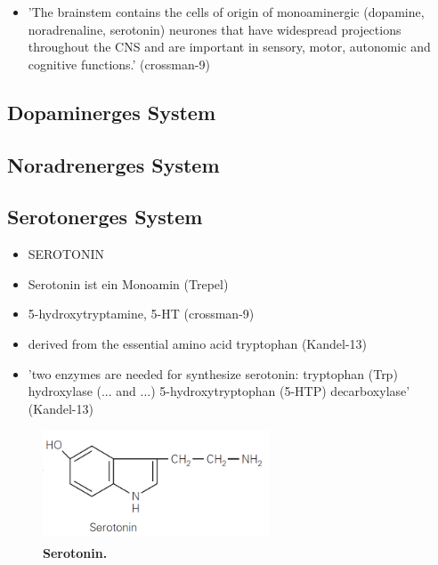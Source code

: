 \documentclass[12pt,a4paper,pdftex]{article}
\begin{document}
\begin{itemize}
    \item 'The brainstem contains the cells of origin of monoaminergic (dopamine, noradrenaline, serotonin) neurones that have widespread projections throughout the CNS and are important in sensory, motor, autonomic and cognitive functions.' (crossman-9)
\end{itemize}{}


\subsection{Dopaminerges System}
\label{dopaminerges_system}

\subsection{Noradrenerges System}
\label{noradrenerges_system}

\subsection{Serotonerges System}
\label{serotonerges_system}

\begin{itemize}
    \item SEROTONIN
    \item Serotonin ist ein Monoamin (Trepel)
    \item 5-hydroxytryptamine, 5-HT (crossman-9)
    \item derived from the essential amino acid tryptophan (Kandel-13)
    \item 'two enzymes are needed for synthesize serotonin: tryptophan (Trp) hydroxylase (... and ...) 5-hydroxytryptophan (5-HTP) decarboxylase' (Kandel-13)
\end{itemize}

\begin{figure}[H]
    \centering
    \includegraphics[width=0.6\textwidth]{pictures/Bilder_monoamine_systeme/serotonin.PNG}
    \caption{\textbf{Serotonin.} \textsuperscript{\cite[13]{kandel2013principles}}}
    \label{fig:serotonin}
\end{figure}{}
\end{document}
